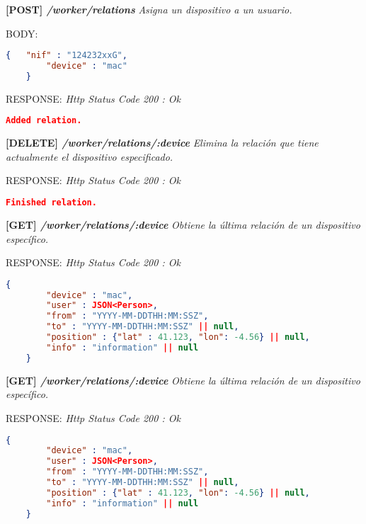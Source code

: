 \textbf{[POST] \textit{/worker/relations }}
\textit{Asigna un dispositivo a un usuario.}

    BODY:
   \begin{lstlisting}[language=json,firstnumber=1]
    {   "nif" : "124232xxG",
        "device" : "mac"
    }
    \end{lstlisting} 
    
    RESPONSE: \newline
    \textit{Http Status Code 200 : Ok}
    \begin{lstlisting}[language=json,firstnumber=1]
    Added relation.
    \end{lstlisting}
 \newline

\textbf{[DELETE] \textit{/worker/relations/:device }}
\textit{Elimina la relación que tiene actualmente el dispositivo especificado.}
    
    RESPONSE: \newline
    \textit{Http Status Code 200 : Ok}
    \begin{lstlisting}[language=json,firstnumber=1]
    Finished relation.
    \end{lstlisting}
\hline \newline

\textbf{[GET] \textit{/worker/relations/:device }}
\textit{Obtiene la última relación de un dispositivo específico.}
    
    RESPONSE: \newline
    \textit{Http Status Code 200 : Ok}
    \begin{lstlisting}[language=json,firstnumber=1]
    {
        "device" : "mac",
        "user" : JSON<Person>,
        "from" : "YYYY-MM-DDTHH:MM:SSZ",
        "to" : "YYYY-MM-DDTHH:MM:SSZ" || null,
        "position" : {"lat" : 41.123, "lon": -4.56} || null,
        "info" : "information" || null
    }
    \end{lstlisting}
\hline \newline

\textbf{[GET] \textit{/worker/relations/:device }}
\textit{Obtiene la última relación de un dispositivo específico.}
    
    RESPONSE: \newline
    \textit{Http Status Code 200 : Ok}
    \begin{lstlisting}[language=json,firstnumber=1]
    {
        "device" : "mac",
        "user" : JSON<Person>,
        "from" : "YYYY-MM-DDTHH:MM:SSZ",
        "to" : "YYYY-MM-DDTHH:MM:SSZ" || null,
        "position" : {"lat" : 41.123, "lon": -4.56} || null,
        "info" : "information" || null
    }
    \end{lstlisting}


